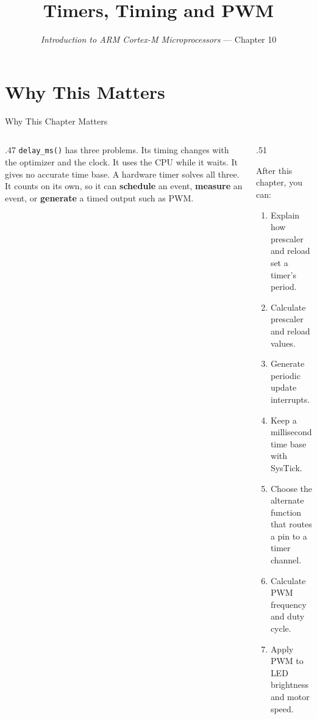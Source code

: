 \documentclass[9pt,aspectratio=169,xcolor=table]{beamer}
\title{Timers, Timing and PWM}
\subtitle{\emph{Introduction to ARM Cortex-M Microprocessors} --- Chapter 10}
\begin{document}
\titlepage

\section{Why This Matters}

\begin{frame}{Why This Chapter Matters}
    \begin{columns}[T]
    \begin{column}{.47\textwidth}
        {\normalsize \texttt{delay\_ms()} has three problems. Its timing changes with the optimizer and the clock. It uses the CPU while it waits. It gives no accurate time base. A hardware timer solves all three. It counts on its own, so it can \textbf{schedule} an event, \textbf{measure} an event, or \textbf{generate} a timed output such as PWM.}
    \end{column}
    \begin{column}{.51\textwidth}
        \begin{block}{After this chapter, you can:}
        {\small
        \begin{enumerate}\itemsep2pt
            \item Explain how prescaler and reload set a timer's period.
            \item Calculate prescaler and reload values.
            \item Generate periodic update interrupts.
            \item Keep a millisecond time base with SysTick.
            \item Choose the alternate function that routes a pin to a timer channel.
            \item Calculate PWM frequency and duty cycle.
            \item Apply PWM to LED brightness and motor speed.
        \end{enumerate}}
        \end{block}
    \end{column}
    \end{columns}
\end{frame}
\end{document}

